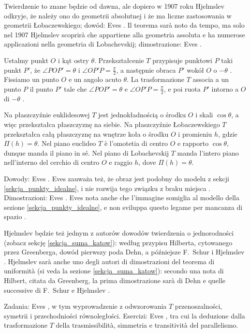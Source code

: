 Twierdzenie to znane będzie od dawna, ale dopiero w 1907 roku Hjelmslev odkryje, że należy ono do geometrii absolutnej i że ma liczne zastosowania w geometrii Łobaczewskiego; dowód: Eves \cite[s. 311--312]{eves1_1972}. %
Il teorema sarà noto da tempo, ma solo nel 1907 Hjelmslev scoprirà che appartiene alla geometria assoluta e ha numerose applicazioni nella geometria di Lobachevskij; dimostrazione: Eves \cite[p. 311--312]{eves1_1972}. %

Ustalmy punkt $O$ i kąt ostry $\theta$. %
Przekształcenie $T$ przypisuje punktowi $P$ taki punkt $P'$, że $\angle POP' = \theta$ i $\angle OP'P = \tfrac{\pi}{2}$, a następnie obraca $P'$ wokół $O$ o $-\theta$ \cite[s. 312]{eves1_1972}. %
Fissiamo un punto $O$ e un angolo acuto $\theta$. %
La trasformazione $T$ associa a un punto $P$ il punto $P'$ tale che $\angle POP' = \theta$ e $\angle OP'P = \tfrac{\pi}{2}$, e poi ruota $P'$ intorno a $O$ di $-\theta$ \cite[p. 312]{eves1_1972}. %

\begin{proposition}
	Na płaszczyźnie euklidesowej $T$ jest jednokładnością o środku $O$ i skali $\cos\theta$, a więc przekształca płaszczyznę na siebie. %
	Na płaszczyźnie Łobaczewskiego $T$ przekształca całą płaszczyznę na wnętrze koła o środku $O$ i promieniu $h$, gdzie $\Pi(h) = \theta$. %
	Nel piano euclideo $T$ è l'omotetia di centro $O$ e rapporto $\cos\theta$, dunque manda il piano in sé. %
	Nel piano di Lobachevskij $T$ manda l'intero piano nell'interno del cerchio di centro $O$ e raggio $h$, dove $\Pi(h) = \theta$. %
\end{proposition}

Dowody: Eves \cite[s. 312--313]{eves1_1972}. %
Eves zauważa też, że obraz jest podobny do modelu z sekcji \ref{sekcja_punkty_idealne}, i nie rozwija tego związku z braku miejsca \cite[s. 313]{eves1_1972}. %
Dimostrazioni: Eves \cite[p. 312--313]{eves1_1972}. %
Eves nota anche che l'immagine somiglia al modello della sezione \ref{sekcja_punkty_idealne}, e non sviluppa questo legame per mancanza di spazio \cite[p. 313]{eves1_1972}. %

Hjelmslev będzie też jednym z autorów dowodów twierdzenia o jednorodności (zobacz sekcję \ref{sekcja_suma_katow}): według przypisu Hilberta, cytowanego przez Greenberga, dowód pierwszy poda Dehn, a późniejsze F.~Schur i Hjelmslev \cite[s. 208]{greenberg_2010}. %
Hjelmslev sarà anche uno degli autori di dimostrazioni del teorema di uniformità (si veda la sezione \ref{sekcja_suma_katow}): secondo una nota di Hilbert, citata da Greenberg, la prima dimostrazione sarà di Dehn e quelle successive di F.~Schur e Hjelmslev \cite[p. 208]{greenberg_2010}. %

Zadania: Eves \cite[s. 314]{eves1_1972}, w tym wyprowadzenie z odwzorowania $T$ przenoszalności, symetrii i przechodniości równoległości. %
Esercizi: Eves \cite[p. 314]{eves1_1972}, tra cui la deduzione dalla trasformazione $T$ della trasmissibilità, simmetria e transitività del parallelismo. %
